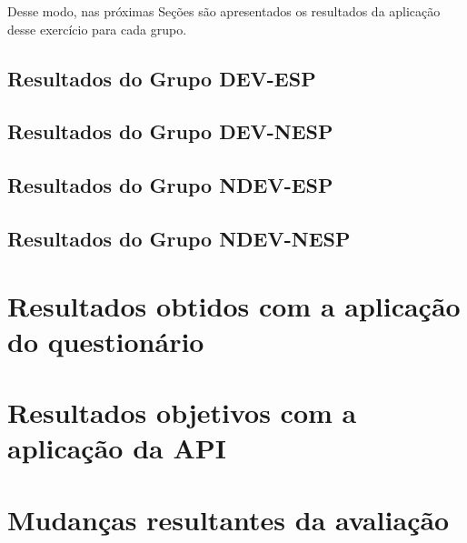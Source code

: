 Desse modo, nas próximas Seções são apresentados os resultados da aplicação desse exercício para cada grupo.

\subsection{Resultados do Grupo DEV-ESP}
\label{subsec:devesp}


\subsection{Resultados do Grupo DEV-NESP}
\label{subsec:devesp}

\subsection{Resultados do Grupo NDEV-ESP}
\label{subsec:devesp}

\subsection{Resultados do Grupo NDEV-NESP}
\label{subsec:devesp}


\section{Resultados obtidos com a aplicação do questionário}
\label{sec:questionarioexercicio}




\section{Resultados objetivos com a aplicação da API}
\label{sec:avaliacaoapi}


\section{Mudanças resultantes da avaliação}
\label{sec:mudanasresultantes}